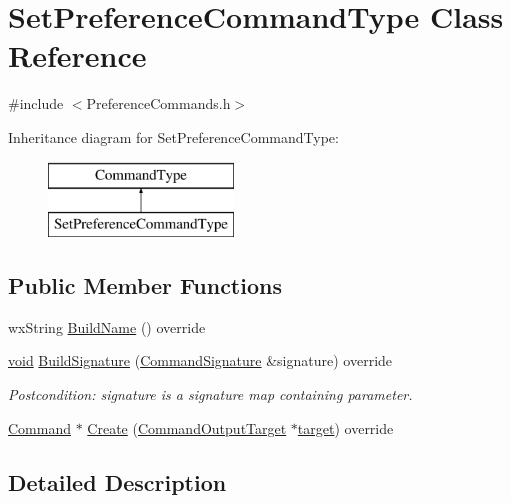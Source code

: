 \hypertarget{class_set_preference_command_type}{}\section{Set\+Preference\+Command\+Type Class Reference}
\label{class_set_preference_command_type}


{\ttfamily \#include $<$Preference\+Commands.\+h$>$}

Inheritance diagram for Set\+Preference\+Command\+Type\+:\begin{figure}[H]
\begin{center}
\leavevmode
\includegraphics[height=2.000000cm]{class_set_preference_command_type}
\end{center}
\end{figure}
\subsection*{Public Member Functions}
\begin{DoxyCompactItemize}
\item 
wx\+String \hyperlink{class_set_preference_command_type_a4f5e393681bc39001dc89c3fc780e391}{Build\+Name} () override
\item 
\hyperlink{sound_8c_ae35f5844602719cf66324f4de2a658b3}{void} \hyperlink{class_set_preference_command_type_a477104ac4d48a67768091fa20f9f7a67}{Build\+Signature} (\hyperlink{class_command_signature}{Command\+Signature} \&signature) override
\begin{DoxyCompactList}\small\item\em Postcondition\+: signature is a \textquotesingle{}signature\textquotesingle{} map containing parameter. \end{DoxyCompactList}\item 
\hyperlink{class_command}{Command} $\ast$ \hyperlink{class_set_preference_command_type_ab3123881debfeb8d92ffbf18efb34347}{Create} (\hyperlink{class_command_output_target}{Command\+Output\+Target} $\ast$\hyperlink{lib_2expat_8h_a15a257516a87decb971420e718853137}{target}) override
\end{DoxyCompactItemize}


\subsection{Detailed Description}


